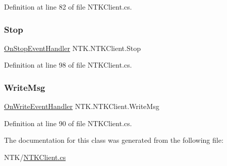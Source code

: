 Definition at line 82 of file N\+T\+K\+Client.\+cs.

\mbox{\label{class_n_t_k_1_1_n_t_k_client_a2c88bbcc3876c947aec79af93f213474}} 
\subsubsection{\texorpdfstring{Stop}{Stop}}
{\footnotesize\ttfamily \mbox{\hyperlink{namespace_n_t_k_ac2573df1e8f9ef401f201a96c0333d92}{On\+Stop\+Event\+Handler}} N\+T\+K.\+N\+T\+K\+Client.\+Stop}







Definition at line 98 of file N\+T\+K\+Client.\+cs.

\mbox{\label{class_n_t_k_1_1_n_t_k_client_a200b044e735eb5123ea71b51abc26fe6}} 
\subsubsection{\texorpdfstring{WriteMsg}{WriteMsg}}
{\footnotesize\ttfamily \mbox{\hyperlink{namespace_n_t_k_a664e2a81c1b642a3270f33d0848ac27e}{On\+Write\+Event\+Handler}} N\+T\+K.\+N\+T\+K\+Client.\+Write\+Msg}







Definition at line 90 of file N\+T\+K\+Client.\+cs.



The documentation for this class was generated from the following file\+:\begin{DoxyCompactItemize}
\item 
N\+T\+K/\mbox{\hyperlink{_n_t_k_client_8cs}{N\+T\+K\+Client.\+cs}}\end{DoxyCompactItemize}
